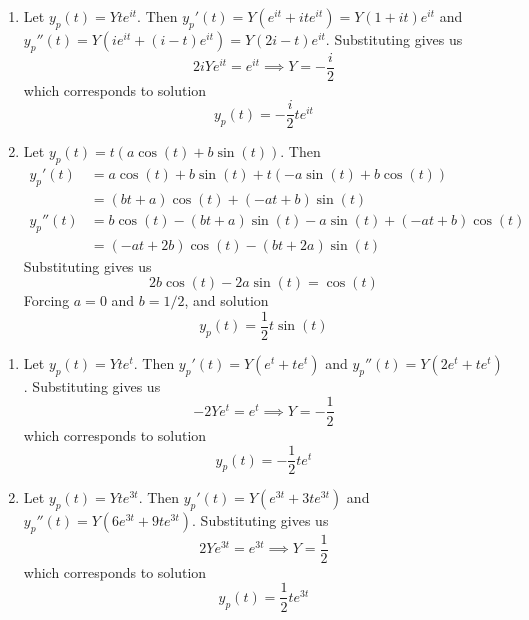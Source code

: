 \documentclass[a4paper]{article}
\begin{document}
\begin{enumerate}[label=(\alph*)]
	\item Let \( y_{p } \!\left( t  \right) = Yte^{it } \). Then \( y_{p }'\!\left( t  \right) = Y \!\left( e^{it } + ite^{it } \right) = Y \!\left( 1 + it  \right)e^{it } \) and \( y_{p }''\!\left( t  \right) = Y \!\left( ie^{it } + \!\left( i - t  \right)e^{it } \right) = Y \!\left( 2i - t  \right)e^{it} \). Substituting gives us
	\[
		2iYe^{it } = e^{it } \implies Y = -\frac{i }{2} 
	\]
	which corresponds to solution
	\[
		y_{p } \!\left( t  \right) = -\frac{i }{2}te^{it } 
	\]
	\item Let \( y_{p } \!\left( t  \right) = t \!\left( a \cos\!\left(t \right) + b \sin\!\left(t \right)  \right) \). Then
	\begin{align*}
		y_{p }'\!\left( t  \right) & = a \cos\!\left(t \right) + b \sin\!\left(t \right) + t \!\left( -a \sin\!\left(t \right) + b \cos\!\left( t \right)  \right) \\
					   & = \!\left( bt + a  \right)\cos\!\left(t \right) + \!\left( -at + b  \right)\sin\!\left(t \right) \\
		y_{p }''\!\left( t  \right) & = b \cos\!\left(t \right) - \!\left( bt + a  \right) \sin\!\left(t \right) - a \sin\!\left(t \right) + \!\left( -at + b  \right) \cos\!\left(t \right) \\ 
					    & = \!\left( -at + 2b \right) \cos\!\left(t \right) - \!\left( bt + 2a \right) \sin\!\left( t \right)
	\end{align*}
	Substituting gives us
	\[
		2b \cos\!\left(t \right) - 2a \sin\!\left(t \right) = \cos\!\left(t \right)  
	\]
	Forcing \( a = 0 \) and \( b = 1/2 \), and solution
	\[
		y_{p } \!\left( t  \right) = \frac{1}{2}t \sin\!\left(t\right) 
	\]
\end{enumerate}


\begin{enumerate}[label=(\alph*)]
	\item Let \( y_{p } \!\left( t  \right) = Yte^{t } \). Then \( y_{p }'\!\left( t  \right) = Y \!\left( e^{t } + te^{t } \right) \) and \( y_{p }''\!\left( t  \right) = Y \!\left( 2e^{t } + te^{t} \right) \). Substituting gives us
	\[
		-2Ye^{t } = e^{t } \implies Y = -\frac{1}{2}
	\]
	which corresponds to solution
	\[
		y_{p } \!\left( t  \right) = -\frac{1}{2}te^{t} 
	\]
	\item Let \( y_{p } \!\left( t  \right) = Yte^{3t} \). Then \( y_{p }'\!\left( t  \right) = Y \!\left( e^{3t} + 3te^{3t} \right) \) and \( y_{p }''\!\left( t  \right) = Y \!\left( 6e^{3t} + 9te^{3t} \right) \). Substituting gives us
	\[
		2Ye^{3t} = e^{3t} \implies Y = \frac{1}{2}
	\]
	which corresponds to solution
	\[
		y_{p } \!\left( t  \right) = \frac{1}{2}te^{3t} 
	\]
\end{enumerate}
\end{document}
